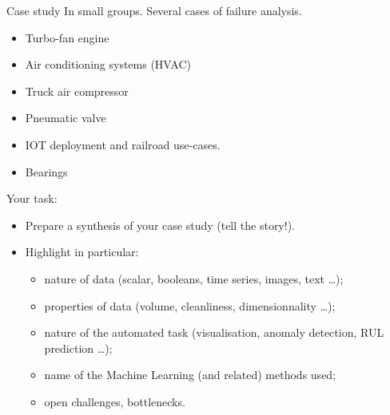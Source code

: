 \documentclass{beamer}
\begin{document}
\begin{frame}{Case study}
In small groups. Several cases of failure analysis.
\begin{itemize}
\item Turbo-fan engine
\item Air conditioning systems (HVAC)
\item Truck air compressor
\item Pneumatic valve
\item IOT deployment and railroad use-cases.
\item Bearings
\end{itemize}
Your task:
\begin{itemize}
\item Prepare a synthesis of your case study (tell the story!).
\item Highlight in particular:
\begin{itemize}
\item nature of data (scalar, booleans, time series, images, text \ldots);
\item properties of data (volume, cleanliness, dimensionnality \ldots);
\item nature of the automated task (visualisation, anomaly detection, RUL prediction \ldots);
\item name of the Machine Learning (and related) methods used;
\item open challenges, bottlenecks.
\end{itemize}
\end{itemize}
\end{frame}
\end{document}
